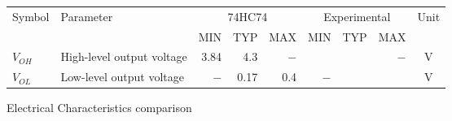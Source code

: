 \begin{tabular}{|l|l|r|r|r|r|r|r|c|}
    \toprule
    Symbol  &Parameter  &\multicolumn{3}{|c|}{74HC74}&\multicolumn{3}{|c|}{Experimental}&Unit\\
            &           &   MIN&TYP&MAX&MIN&TYP&MAX&\\
    \midrule
    $V_{OH}$&High-level output voltage&3.84&4.3&$-$&  &  &$-$&V\\
    $V_{OL}$&Low-level output voltage &$-$&0.17&0.4&$-$&  &  &V\\
    \bottomrule
\end{tabular}
\caption{Electrical Characteristics comparison}